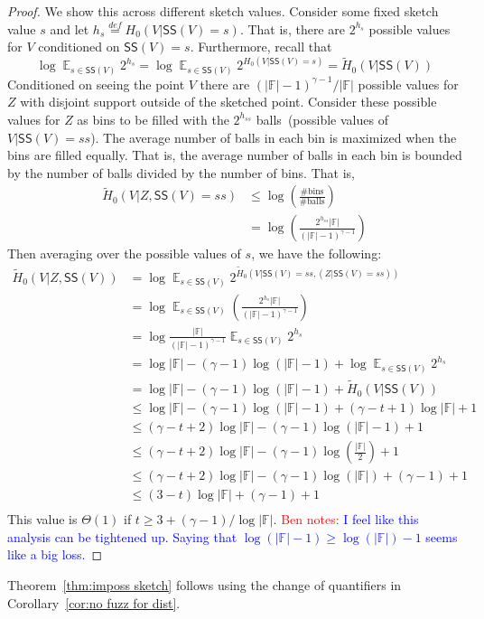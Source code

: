 \documentclass[11pt]{article}
\newcommand{\thref}[1]{\mbox{Theorem~\ref{#1}}}
\newcommand{\corref}[1]{\mbox{Corollary~\ref{#1}}}
\DeclareMathOperator*{\expe}{\mathbb{E}}
\newcommand{\class}[1]{{\ensuremath{\mathsf{#1}}}}
\newcommand{\sketch}{\ensuremath{\class{SS}}\xspace}
\newcommand{\authnote}[2]{{\textcolor{red}{\textsf{#1 notes: }\textcolor{blue}{ #2}}\marginpar{\textcolor{red}{\textbf{!!!!!}}}}}
\newcommand{\authnote}[2]{}
\newcommand{\bnote}[1]{{\authnote{Ben}{#1}}}
\begin{document}
\begin{proof}
We show this across different sketch values.  Consider some fixed sketch value $s$ and let $h_s \overset{def}= H_0(V | \sketch(V) = s)$.  That is, there are $2^{h_s}$ possible values for $V$ conditioned on $\sketch(V) = s$.  Furthermore, recall that 
\[
\log \expe_{s\in \sketch(V)} 2^{h_s} = \log \expe_{s\in \sketch(V)} 2^{H_0(V | \sketch(V) = s)}  = \tilde{H}_0(V | \sketch(V)) %
\]  
Conditioned on seeing the point $V$ there are $(|\mathbb{F}|-1)^{\gamma-1}/|\mathbb{F}|$ possible values for $Z$ with disjoint support outside of the sketched point.  Consider these possible values for $Z$ as bins to be filled with the $2^{h_{ss}}$ balls~(possible values of $V | \sketch(V)=ss$).  The average number of balls in each bin is maximized when the bins are filled equally.  That is, the average number of balls in each bin is bounded by the number of balls divided by the number of bins.  That is, 
\begin{align*}
\tilde{H}_0(V |Z  , \sketch(V) = ss) &\le \log \left(\frac{\text{\# bins}}{\text{\# balls}}\right)\\
&= \log \left(\frac{2^{h_{ss}}|\mathbb{F}|}{(|\mathbb{F}|-1)^{\gamma-1}} \right)
\end{align*}
Then averaging over the possible values of $s$, we have the following:
\begin{align*}
\tilde{H}_0(V |Z , \sketch(V) ) &= \log \expe_{s\in \sketch(V)} 2^{\tilde{H}_0(V |  \sketch(V) =ss , (Z| \sketch(V) =ss) )}\\
&= \log\expe_{s\in \sketch(V)} \left(\frac{2^{h_s}|\mathbb{F}|}{(|\mathbb{F}|-1)^{\gamma-1}} \right)\\
&= \log \frac{|\mathbb{F}|}{(|\mathbb{F}|-1)^{\gamma-1}} \expe_{s\in \sketch(V)} 2^{h_s}\\
&=\log |\mathbb{F}| - (\gamma -1)\log (|\mathbb{F}|-1) + \log \expe_{s\in \sketch(V)} 2^{h_s}\\
&=\log |\mathbb{F}| - (\gamma -1)\log (|\mathbb{F}|-1) + \tilde{H}_0(V | \sketch(V))\\ 
&\le \log |\mathbb{F}| - (\gamma -1)\log (|\mathbb{F}|-1) + (\gamma-t+1)\log |\mathbb{F}|+1\\
&\le (\gamma-t+2)\log |\mathbb{F}| - (\gamma-1) \log (|\mathbb{F}|-1)+1\\
&\le (\gamma-t+2)\log |\mathbb{F}| - (\gamma-1) \log (\frac{|\mathbb{F}|}{2})+1\\
&\le (\gamma-t+2)\log |\mathbb{F}| - (\gamma-1) \log (|\mathbb{F}|) + (\gamma -1)+1\\
&\le (3-t)\log |\mathbb{F}| + (\gamma -1)+1\\
\end{align*}
This value is $\Theta(1)$ if $t\ge 3+ (\gamma-1)/\log | \mathbb{F}|$. \bnote{ I feel like this analysis can be tightened up.  Saying that $\log (|\mathbb{F}| -1 ) \ge \log (|\mathbb{F}|)-1$ seems like a big loss.}
 \end{proof}
\noindent \thref{thm:imposs sketch} follows using the change of quantifiers in \corref{cor:no fuzz for dist}.
\end{document}
